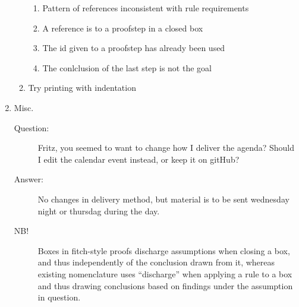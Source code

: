 \documentclass[a4paper]{article}
\begin{document}
\begin{enumerate}
\begin{enumerate}[\HollowBox]
\begin{enumerate}[\HollowBox]
          \item Pattern of references inconsistent with rule requirements
          \item A reference is to a proofstep in a closed box
          \item The id given to a proofstep has already been used
          \item The conlclusion of the last step is not the goal
        \end{enumerate}
      \item Try printing with indentation
    \end{enumerate}
  \item Misc.
    \begin{description}
      \item[Question:] Fritz, you seemed to want to change how I deliver the
      agenda?
      Should I edit the calendar event instead, or keep it on gitHub?
      \item[Answer:] No changes in delivery method, but material is to be 
      sent wednesday night or thursdag during the day.
      \item[NB!] Boxes in fitch-style proofs discharge assumptions when
      closing a box, and thus independently of the conclusion drawn from it,
      whereas existing nomenclature uses ``discharge'' when applying a rule
      to a box and thus drawing conclusions based on findings under the
      assumption in question.
    \end{description}
\end{enumerate}
\end{document}
